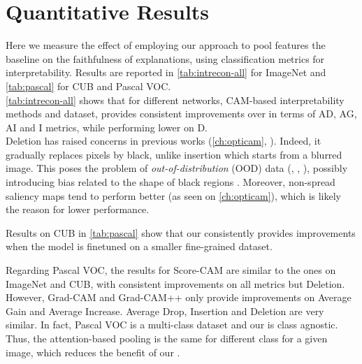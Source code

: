 \section{Quantitative Results}
\label{sec:ca_quant}

Here we measure the effect of employing our \Ours approach to pool features \vs the baseline \gap 
on the faithfulness of explanations, using classification metrics for interpretability. Results are 
reported in \autoref{tab:intrecon-all} for ImageNet and  \autoref{tab:pascal} for CUB and Pascal VOC.\\



\noindent \autoref{tab:intrecon-all} shows that for different networks, CAM-based interpretability 
methods and dataset, \Ours provides consistent improvements over \gap in terms of AD, AG, AI and I 
metrics, while performing lower on D. \\

Deletion has raised concerns in previous works (\autoref{ch:opticam}, \cite{chefer2021transformer}). 
Indeed, it gradually replaces pixels by black, unlike insertion which starts from a blurred image. 
This poses the problem of \emph{out-of-distribution} (OOD) data (\cite{gomez2022metrics},
\cite{hase2021outofdistribution}, \cite{qiu2021resisting}), possibly introducing bias related to 
the shape of black regions \autocite{rong2022consistent}. Moreover, non-spread saliency maps tend to 
perform better (as seen on \autoref{ch:opticam}), which is likely the reason for lower performance. 



\noindent Results on CUB in \autoref{tab:pascal} show that our \Ours consistently provides 
improvements when the model is finetuned on a smaller fine-grained dataset.

\noindent Regarding Pascal VOC, the results for Score-CAM are similar to the ones on ImageNet and 
CUB, with consistent improvements on all metrics but Deletion. 
However, Grad-CAM and Grad-CAM++ only provide improvements on Average Gain and Average Increase. 
Average Drop, Insertion and Deletion are very similar.
In fact, Pascal VOC is a multi-class dataset and  our \Ours is class agnostic. Thus, the 
attention-based pooling is the same for different class for a given image, which reduces the 
benefit of our \Ours.

